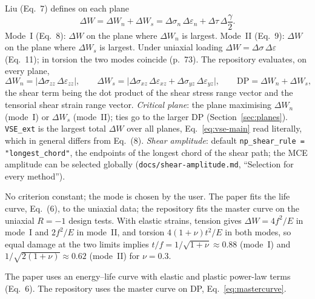 Liu (Eq.~7) defines on each plane
\begin{equation}
\Delta W = \Delta W_n + \Delta W_s = \Delta\sigma_n\,\Delta\varepsilon_n + \Delta\tau\,\Delta\frac{\gamma}{2} .
\label{eq:vse-main}
\end{equation}
Mode~I (Eq.~8): $\Delta W$ on the plane where $\Delta W_n$ is largest. Mode~II (Eq.~9): $\Delta W$ on
the plane where $\Delta W_s$ is largest. Under uniaxial loading $\Delta W=\Delta\sigma\,\Delta\varepsilon$
(Eq.~11); in torsion the two modes coincide (p.~73). The repository evaluates, on every plane,
\begin{equation}
\Delta W_n = \lvert\Delta\sigma_{zz}\,\Delta\varepsilon_{zz}\rvert,\qquad
\Delta W_s = \lvert\Delta\sigma_{xz}\,\Delta\varepsilon_{xz}+\Delta\sigma_{yz}\,\Delta\varepsilon_{yz}\rvert,\qquad
\mathrm{DP} = \Delta W_n + \Delta W_s ,
\label{eq:vse-plane}
\end{equation}
the shear term being the dot product of the shear stress range vector and the tensorial shear
strain range vector. \emph{Critical plane}: the plane maximising $\Delta W_n$ (mode~I) or
$\Delta W_s$ (mode~II); ties go to the larger DP (Section~\ref{sec:planes}). \texttt{VSE\_ext} is
the largest total $\Delta W$ over all planes, Eq.~\eqref{eq:vse-main} read literally, which in
general differs from Eq.~(8). \emph{Shear amplitude}: default \texttt{np\_shear\_rule =
"longest\_chord"}, the endpoints of the longest chord of the shear path; the MCE amplitude can be
selected globally (\texttt{docs/shear-amplitude.md}, ``Selection for every method'').

 No criterion constant; the mode is chosen by the user. The paper
fits the life curve, Eq.~(6), to the uniaxial data; the repository fits the master curve on the
uniaxial $R=-1$ design tests. With elastic strains, tension gives $\Delta W=4f^2/E$ in mode~I and
$2f^2/E$ in mode~II, and torsion $4(1+\nu)t^2/E$ in both modes, so equal damage at the two limits
implies $t/f=1/\sqrt{1+\nu}\approx0.88$ (mode~I) and $1/\sqrt{2(1+\nu)}\approx0.62$ (mode~II) for
$\nu=0.3$.

 The paper uses an energy--life curve with elastic and plastic power-law terms
(Eq.~6). The repository uses the master curve on DP, Eq.~\eqref{eq:mastercurve}.

